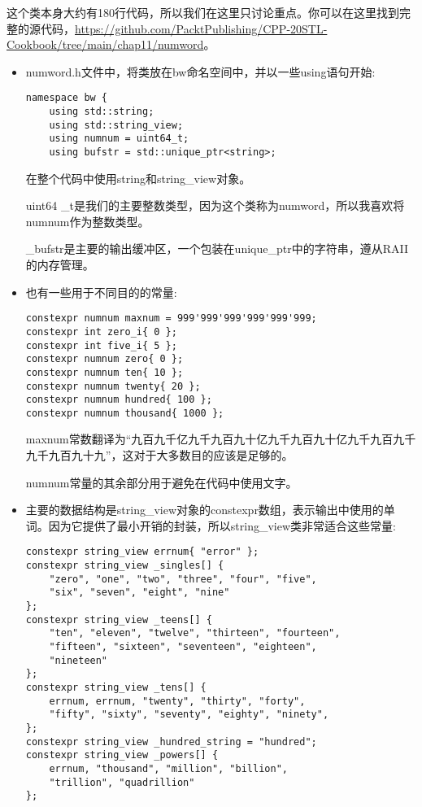 这个类本身大约有180行代码，所以我们在这里只讨论重点。你可以在这里找到完整的源代码，\url{https://github.com/PacktPublishing/CPP-20STL-Cookbook/tree/main/chap11/numword}。

\begin{itemize}
\item 
numword.h文件中，将类放在bw命名空间中，并以一些using语句开始:

\begin{lstlisting}[style=styleCXX]
namespace bw {
	using std::string;
	using std::string_view;
	using numnum = uint64_t;
	using bufstr = std::unique_ptr<string>;
\end{lstlisting}

在整个代码中使用string和string\_view对象。

uint64 \_t是我们的主要整数类型，因为这个类称为numword，所以我喜欢将numnum作为整数类型。

\_bufstr是主要的输出缓冲区，一个包装在unique\_ptr中的字符串，遵从RAII的内存管理。

\item 
也有一些用于不同目的的常量:

\begin{lstlisting}[style=styleCXX]
constexpr numnum maxnum = 999'999'999'999'999'999;
constexpr int zero_i{ 0 };
constexpr int five_i{ 5 };
constexpr numnum zero{ 0 };
constexpr numnum ten{ 10 };
constexpr numnum twenty{ 20 };
constexpr numnum hundred{ 100 };
constexpr numnum thousand{ 1000 };
\end{lstlisting}

maxnum常数翻译为“九百九千亿九千九百九十亿九千九百九十亿九千九百九千九千九百九十九”，这对于大多数目的应该是足够的。

numnum常量的其余部分用于避免在代码中使用文字。

\item 
主要的数据结构是string\_view对象的constexpr数组，表示输出中使用的单词。因为它提供了最小开销的封装，所以string\_view类非常适合这些常量:

\begin{lstlisting}[style=styleCXX]
constexpr string_view errnum{ "error" };
constexpr string_view _singles[] {
	"zero", "one", "two", "three", "four", "five",
	"six", "seven", "eight", "nine"
};
constexpr string_view _teens[] {
	"ten", "eleven", "twelve", "thirteen", "fourteen",
	"fifteen", "sixteen", "seventeen", "eighteen",
	"nineteen"
};
constexpr string_view _tens[] {
	errnum, errnum, "twenty", "thirty", "forty",
	"fifty", "sixty", "seventy", "eighty", "ninety",
};
constexpr string_view _hundred_string = "hundred";
constexpr string_view _powers[] {
	errnum, "thousand", "million", "billion",
	"trillion", "quadrillion"
};
\end{lstlisting}


\end{itemize}
